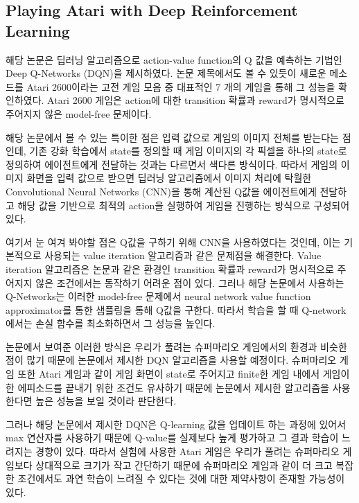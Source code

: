 \subsection{Playing Atari with Deep Reinforcement Learning}
해당 논문은 딥러닝 알고리즘으로 action-value function의 Q 값을 예측하는 기법인 Deep Q-Networks (DQN)을 제시하였다. 
논문 제목에서도 볼 수 있듯이 새로운 메소드를 Atari 2600이라는 고전 게임 모음 중 대표적인 7 개의 게임을 통해 그 성능을 확인하였다. 
Atari 2600 게임은 action에 대한 transition 확률과 reward가 명시적으로 주어지지 않은 model-free 문제이다.

해당 논문에서 볼 수 있는 특이한 점은 입력 값으로 게임의 이미지 전체를 받는다는 점인데, 기존 강화 학습에서 state를 정의할 때 게임 이미지의 각 픽셀을 하나의 state로 정의하여 에이전트에게 전달하는 것과는 다르면서 색다른 방식이다. 
따라서 게임의 이미지 화면을 입력 값으로 받으면 딥러닝 알고리즘에서 이미지 처리에 탁월한 Convolutional Neural Networks (CNN)을 통해 계산된 Q값을 에이전트에게 전달하고 해당 값을 기반으로 최적의 action을 실행하여 게임을 진행하는 방식으로 구성되어 있다. 

여기서 눈 여겨 봐야할 점은 Q값을 구하기 위해 CNN을 사용하였다는 것인데, 이는 기본적으로 사용되는 value iteration 알고리즘과 같은 문제점을 해결한다. 
Value iteration 알고리즘은 논문과 같은 환경인 transition 확률과 reward가 명시적으로 주어지지 않은 조건에서는 동작하기 어려운 점이 있다. 
그러나 해당 논문에서 사용하는 Q-Networks는 이러한 model-free 문제에서 neural network value function approximator를 통한 샘플링을 통해 Q값을 구한다. 
따라서 학습을 할 때 Q-network에서는 손실 함수를 최소화하면서 그 성능을 높인다. 

논문에서 보여준 이러한 방식은 우리가 풀려는 슈퍼마리오 게임에서의 환경과 비슷한 점이 많기 때문에 논문에서 제시한 DQN 알고리즘을 사용할 예정이다. 
슈퍼마리오 게임 또한 Atari 게임과 같이 게임 화면이 state로 주어지고 finite한 게임 내에서 게임이 한 에피소드를 끝내기 위한 조건도 유사하기 때문에 논문에서 제시한 알고리즘을 사용한다면 높은 성능을 보일 것이라 판단한다. 

그러나 해당 논문에서 제시한 DQN은 Q-learning 값을 업데이트 하는 과정에 있어서 max 연산자를 사용하기 때문에 Q-value를 실제보다 높게 평가하고 그 결과 학습이 느려지는 경향이 있다. 
따라서 실험에 사용한 Atari 게임은 우리가 풀려는 슈퍼마리오 게임보다 상대적으로 크기가 작고 간단하기 때문에 슈퍼마리오 게임과 같이 더 크고 복잡한 조건에서도 과연 학습이 느려질 수 있다는 것에 대한 제약사항이 존재할 가능성이 있다. 

